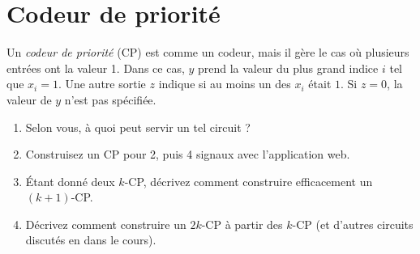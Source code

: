 \documentclass[11pt]{article}
\begin{document}
\section{Codeur de priorité}

Un \emph{codeur de priorité} (CP) est comme un codeur, mais il gère le
cas où plusieurs entrées ont la valeur 1. Dans ce cas, $y$ prend
la valeur du plus grand indice $i$ tel que $x_i=1$. Une autre sortie $z$
indique si au moins un des $x_i$ était $1$. Si $z=0$, la valeur de $y$
n'est pas spécifiée.

\begin{enumerate}
 \item Selon vous, à quoi peut servir un tel circuit ?
 \item Construisez un CP pour 2, puis 4 signaux avec l'application web.
 \item Étant donné deux $k$-CP, décrivez comment
   construire efficacement un $(k+1)$-CP.
 \item Décrivez comment construire un $2k$-CP à partir des $k$-CP
   (et d'autres circuits discutés en dans le cours).
\end{enumerate}

\iffalse
\section{Verrou RS}
\begin{enumerate}
 \item Construisez un verrou RS, mais avec des NON-ET au lieu des NON-OU.
  Quel sera le comportement des sorties $Q,\bar Q$ en fonction des entrées
  $R,S,Q, \bar Q$ ?
 \item Comparez le comportement d'un verrou construit avec des portes au
  verrou directement disponible dans l'appli.
\end{enumerate}

\section{Verrou T et compteur}
\begin{enumerate}
 \item Expérimentez avec le verrou T disponsible dans l'appli. Qu'est-ce qu'il
  fait ? (Essayez-le avec un interrupteur et un impulseur en entrée.)
 \item Chargez l'exemple qui simule un compteur binaire (en bas de la page).
  Modifiez-le pour qu'il augmente le compteur au lieu de le décroître.
\end{enumerate}
\fi
\end{document}
